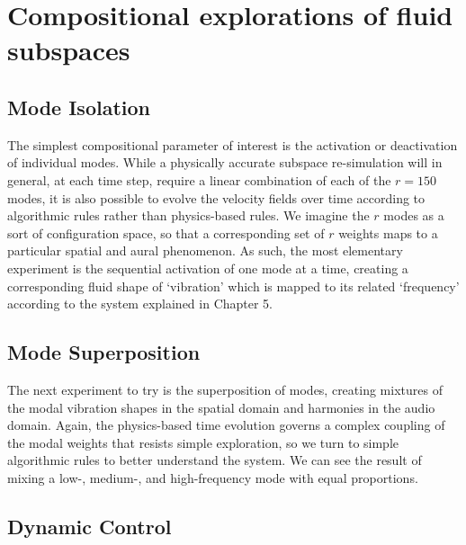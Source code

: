\chapter[Compositional exploration of fluid subspaces]{Compositional explorations of fluid subspaces}

\section{Mode Isolation}
The simplest compositional parameter of interest is the activation or deactivation of individual modes. While a physically accurate subspace re-simulation will in general, at each time step, require a linear combination of each of the $r = 150$ modes, it is also possible to evolve the velocity fields over time according to algorithmic rules rather than physics-based rules. We imagine the $r$ modes as a sort of configuration space, so that a corresponding set of $r$ weights maps to a particular spatial and aural phenomenon. As such, the most elementary experiment is the sequential activation of one mode at a time, creating a corresponding fluid shape of `vibration' which is mapped to its related `frequency' according to the system explained in Chapter 5.

\section{Mode Superposition}
The next experiment to try is the superposition of modes, creating mixtures of the modal vibration shapes in the spatial domain and harmonies in the audio domain. Again, the physics-based time evolution governs a complex coupling of the modal weights that resists simple exploration, so we turn to simple algorithmic rules to better understand the system. We can see the result of mixing a low-, medium-, and high-frequency mode with equal proportions.

\section{Dynamic Control}
